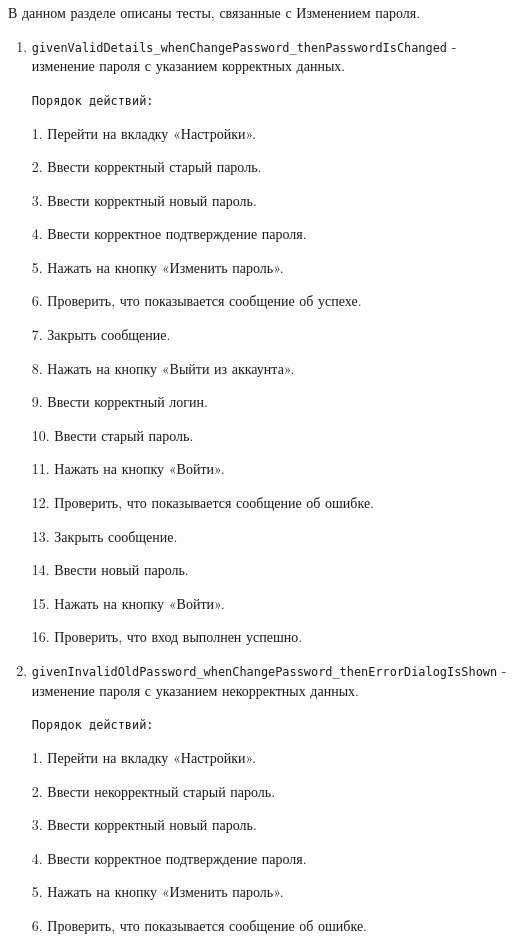 \documentclass[a4paper, 14pt]{article}
\begin{document}
В данном разделе описаны тесты, связанные с Изменением пароля.

\begin{enumerate}
    \item \texttt{givenValidDetails\_whenChangePassword\_thenPasswordIsChanged} - изменение пароля с указанием корректных данных.

    \texttt{Порядок действий:}
    
    1. Перейти на вкладку «Настройки».
    
    2. Ввести корректный старый пароль.

    3. Ввести корректный новый пароль.

    4. Ввести корректное подтверждение пароля.

    5. Нажать на кнопку «Изменить пароль».

    6. Проверить, что показывается сообщение об успехе.

    7. Закрыть сообщение.

    8. Нажать на кнопку «Выйти из аккаунта».

    9. Ввести корректный логин.

    10. Ввести старый пароль.

    11. Нажать на кнопку «Войти».

    12. Проверить, что показывается сообщение об ошибке.

    13. Закрыть сообщение.

    14. Ввести новый пароль.

    15. Нажать на кнопку «Войти».

    16. Проверить, что вход выполнен успешно.
    
    \item \texttt{givenInvalidOldPassword\_whenChangePassword\_thenErrorDialogIsShown} - изменение пароля с указанием некорректных данных.

    \texttt{Порядок действий:}
    
    1. Перейти на вкладку «Настройки».
    
    2. Ввести некорректный старый пароль.

    3. Ввести корректный новый пароль.

    4. Ввести корректное подтверждение пароля.

    5. Нажать на кнопку «Изменить пароль».

    6. Проверить, что показывается сообщение об ошибке.
\end{enumerate}
\end{document}
